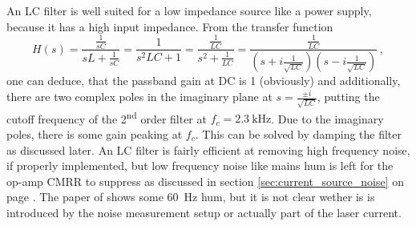 An LC filter is well suited for a low impedance source like a power supply, because it has a high input impedance. From the transfer function
\begin{equation}
    H(s) = \frac{\frac{1}{sC}}{sL + \frac{1}{sC}} = \frac{1}{s^2LC +1} = \frac{\frac{1}{LC}}{s^2 + \frac{1}{LC}} = \frac{\frac{1}{LC}}{\left(s+i\frac{1}{\sqrt{LC}}\right)\left(s-i\frac{1}{\sqrt{LC}}\right)}\,, \label{eqn:transfer_function_lc_filter}
\end{equation}
one can deduce, that the passband gain at DC is \num{1} (obviously) and additionally, there are two complex poles in the imaginary plane at $s = \frac{\pm i}{\sqrt{LC}}$, putting the cutoff frequency of the 2\textsuperscript{nd} order filter at $f_c = \qty{2.3}{\kHz}$. Due to the imaginary poles, there is some gain peaking at $f_c$. This can be solved by damping the filter as discussed later. An LC filter is fairly efficient at removing high frequency noise, if properly implemented, but low frequency noise like mains hum is left for the op-amp CMRR to suppress as discussed in section \ref{sec:current_source_noise} on page \pageref{sec:current_source_noise}. The paper of \citeauthor{libbrecht_hall} \cite{libbrecht_hall} shows some \qty{60}{\Hz} hum, but it is not clear wether is is introduced by the noise measurement setup or actually part of the laser current.


